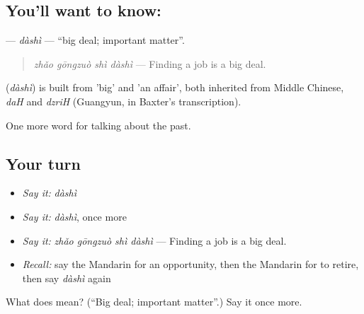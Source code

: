 \subsection*{You'll want to know: }
\textbf{} — \emph{dàshì} — \textquotedblleft{}big deal; important matter\textquotedblright{}.

\begin{quote}
\textbf{} \emph{zhǎo gōngzuò shì dàshì} — Finding a job is a big deal.
\end{quote}

\begin{cousinweb}
\textbf{} (\emph{dàshì}) is built from  'big' and  'an affair', both inherited from Middle Chinese, \emph{daH} and \emph{dzriH} (Guangyun, in Baxter's transcription).
\end{cousinweb}

\begin{grammarlens}[title={What you've built}]
One more word for talking about the past.
\end{grammarlens}

\subsection*{Your turn}
\begin{itemize}
\raggedright
  \item \emph{Say it:} \emph{dàshì}
  \item \emph{Say it:} \emph{dàshì}, once more
  \item \emph{Say it:} \emph{zhǎo gōngzuò shì dàshì} — Finding a job is a big deal.
  \item \emph{Recall:} say the Mandarin for an opportunity, then the Mandarin for to retire, then say \emph{dàshì} again
\end{itemize}

\begin{tcolorbox}[breakable,colback=teal!4,colframe=teal!35!black,title={Before you move on}]
What does  mean? (\textquotedblleft{}Big deal; important matter\textquotedblright{}.) Say it once more.
\end{tcolorbox}
